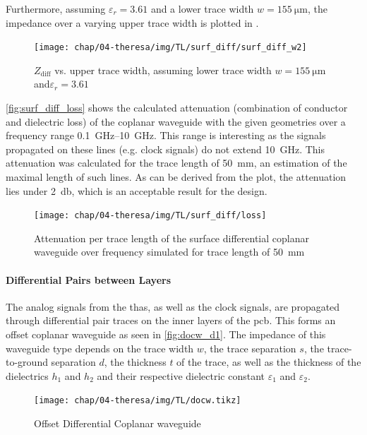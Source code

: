 Furthermore, assuming $\varepsilon_r = 3.61$ and a lower trace width $w = \SI{155}{\micro \meter}$, the impedance over a varying upper trace width is plotted in .

\begin{figure}[tb]
	\centering
	\texttt{[image: chap/04-theresa/img/TL/surf\_diff/surf\_diff\_w2]}
	\caption[DCWG, $Z_\text{diff}$ vs. upper trace width]{$Z_\text{diff}$ vs. upper trace width, assuming lower trace width $w = \SI{155}{\micro \meter}$ and$\varepsilon_r = 3.61$}
	\label{fig:surf_diff_w2}
\end{figure}

\autoref{fig:surf_diff_loss} shows the calculated attenuation (combination of conductor and dielectric loss) of the coplanar waveguide with the given geometries over a frequency range \SIrange{0.1}{10}{\GHz}.
This range is interesting as the signals propagated on these lines (e.g. clock signals) do not extend \SI{10}{\GHz}.
This attenuation was calculated for the trace length of \SI{50}{\mm}, an estimation of the maximal length of such lines.
As can be derived from the plot, the attenuation lies under \SI{2}{\decibel}, which is an acceptable result for the design.

\begin{figure}[bhbh]
	\centering
	\texttt{[image: chap/04-theresa/img/TL/surf\_diff/loss]}
	\caption[Attenuation DCWG for \SI{200}{\mm}]{Attenuation per trace length of the surface differential coplanar waveguide over frequency simulated for trace length of \SI{50}{\mm}}
	\label{fig:surf_diff_loss}
\end{figure}

\paragraph{Differential Pairs between Layers}
The analog signals from the \glspl{tha}, as well as the clock signals, are propagated through differential pair traces on the inner layers of the \gls{pcb}. 
This forms an offset coplanar waveguide as seen in \autoref{fig:docw_d1}.
The impedance of this waveguide type depends on the trace width $w$, the trace separation $s$, the trace-to-ground separation $d$, the thickness $t$ of the trace, as well as the thickness of the dielectrics $h_1$ and $h_2$ and their respective dielectric constant $\varepsilon_1$ and $\varepsilon_2$.

\begin{figure}[tb]
	\centering
	\texttt{[image: chap/04-theresa/img/TL/docw.tikz]}
	\caption{Offset Differential Coplanar waveguide}
	\label{fig:docw_d1}
\end{figure}

